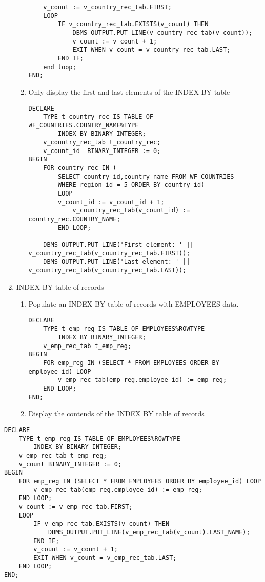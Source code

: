 \documentclass[11pt]{article}
\begin{document}
\begin{enumerate}
\begin{enumerate}
\begin{verbatim}
    v_count := v_country_rec_tab.FIRST;
    LOOP
        IF v_country_rec_tab.EXISTS(v_count) THEN
            DBMS_OUTPUT.PUT_LINE(v_country_rec_tab(v_count));
            v_count := v_count + 1;
            EXIT WHEN v_count = v_country_rec_tab.LAST;
        END IF;
    end loop;
END;
\end{verbatim}
\item Only display the first and last elements of the INDEX BY table
\begin{verbatim}
DECLARE
    TYPE t_country_rec IS TABLE OF WF_COUNTRIES.COUNTRY_NAME%TYPE
        INDEX BY BINARY_INTEGER;
    v_country_rec_tab t_country_rec;
    v_count_id  BINARY_INTEGER := 0;
BEGIN
    FOR country_rec IN (
        SELECT country_id,country_name FROM WF_COUNTRIES
        WHERE region_id = 5 ORDER BY country_id)
        LOOP
        v_count_id := v_count_id + 1;
            v_country_rec_tab(v_count_id) := country_rec.COUNTRY_NAME;
        END LOOP;

    DBMS_OUTPUT.PUT_LINE('First element: ' || v_country_rec_tab(v_country_rec_tab.FIRST));
    DBMS_OUTPUT.PUT_LINE('Last element: ' || v_country_rec_tab(v_country_rec_tab.LAST));
\end{verbatim}
\end{enumerate}
\item INDEX BY table of records
\begin{enumerate}
\item Populate an INDEX BY table of records with EMPLOYEES data.
\begin{verbatim}
DECLARE
    TYPE t_emp_reg IS TABLE OF EMPLOYEES%ROWTYPE
        INDEX BY BINARY_INTEGER;
    v_emp_rec_tab t_emp_reg;
BEGIN
    FOR emp_reg IN (SELECT * FROM EMPLOYEES ORDER BY employee_id) LOOP
        v_emp_rec_tab(emp_reg.employee_id) := emp_reg;
    END LOOP;
END;
\end{verbatim}

\item Display the contends of the INDEX BY table of records
\end{enumerate}
\end{enumerate}
\begin{verbatim}
DECLARE
    TYPE t_emp_reg IS TABLE OF EMPLOYEES%ROWTYPE
        INDEX BY BINARY_INTEGER;
    v_emp_rec_tab t_emp_reg;
    v_count BINARY_INTEGER := 0;
BEGIN
    FOR emp_reg IN (SELECT * FROM EMPLOYEES ORDER BY employee_id) LOOP
        v_emp_rec_tab(emp_reg.employee_id) := emp_reg;
    END LOOP;
    v_count := v_emp_rec_tab.FIRST;
    LOOP
        IF v_emp_rec_tab.EXISTS(v_count) THEN
            DBMS_OUTPUT.PUT_LINE(v_emp_rec_tab(v_count).LAST_NAME);
        END IF;
        v_count := v_count + 1;
        EXIT WHEN v_count = v_emp_rec_tab.LAST;
    END LOOP;
END;
\end{verbatim}
\end{document}
